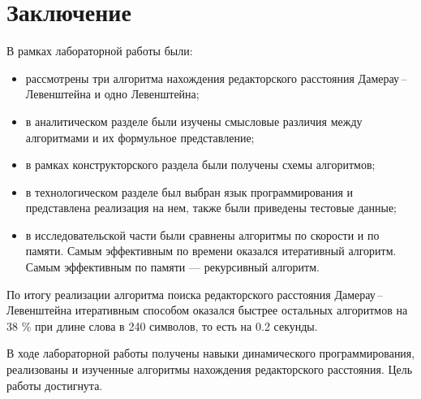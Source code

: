 \chapter*{Заключение}

В рамках лабораторной работы были:

\begin{itemize}
	\item рассмотрены три алгоритма нахождения редакторского расстояния Дамерау\,--\,Левенштейна и одно Левенштейна;
	\item в аналитическом разделе были изучены смысловые различия между алгоритмами и их формульное представление;
	\item в рамках конструкторского раздела были получены схемы алгоритмов;
	\item в технологическом разделе был выбран язык программирования и представлена реализация на нем, также были приведены тестовые данные;
	\item в исследовательской части были сравнены алгоритмы по скорости и по памяти. Самым эффективным по времени оказался итеративный алгоритм. Самым эффективным по памяти --- рекурсивный алгоритм. 
\end{itemize}

По итогу реализации алгоритма поиска редакторского расстояния Дамерау\,--\,Левенштейна итеративным способом оказался быстрее остальных алгоритмов на 38 \% при длине слова в 240 символов, то есть на 0.2 секунды.
 
В ходе лабораторной работы получены навыки динамического программирования, реализованы и изученные алгоритмы нахождения редакторского расстояния. Цель работы достигнута.